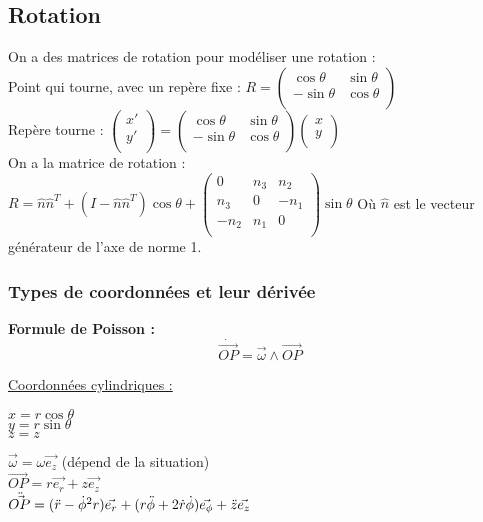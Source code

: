 \documentclass[../main.tex]{subfiles}
\begin{document}
\subsection{Rotation}
On a des matrices de rotation pour modéliser une rotation :\\
Point qui tourne, avec un repère fixe : $R = \begin{pmatrix}
    \cos{\theta} & \sin{\theta}\\
    -\sin{\theta} & \cos{\theta}\\
\end{pmatrix}$\\
Repère tourne : 
$\begin{pmatrix}
    x'\\
    y'\\
\end{pmatrix} = \begin{pmatrix}
    \cos{\theta} & \sin{\theta}\\
    -\sin{\theta} & \cos{\theta}\\
\end{pmatrix} \begin{pmatrix}
    x\\
    y\\
\end{pmatrix}$\\
On a la matrice de rotation : $R = \hat{n} \hat{n}^T + (I-\hat{n} \hat{n}^T)\cos{\theta} + \begin{pmatrix}
    0 & n_3 & n_2\\
    n_3 & 0 & -n_1\\
    -n_2 & n_1 & 0\\
\end{pmatrix} \sin{\theta}$ Où $\hat{n}$ est le vecteur générateur de l'axe de norme 1.\\

\subsubsection{Types de coordonnées et leur dérivée}
\textbf{Formule de Poisson :}\\
\begin{equation}
    \dot{\vec{OP}} = \vec{\omega} \wedge \vec{OP}
\end{equation}

\quad \underline{Coordonnées cylindriques :}\\
\begin{minipage}{.5\textwidth}
    $x = r \cos{\theta}$\\
    $y = r \sin{\theta}$\\
    $z = z$\\
\end{minipage}
\vline
\begin{minipage}{.5\textwidth}
    $\vec{\omega} = \omega \vec{e_z}$ (dépend de la situation)\\
    $\vec{OP} = r \vec{e_r} + z \vec{e_z}$\\
    $\Ddot{\vec{OP}} = (\Ddot{r} - \dot{\phi}^2 r)\vec{e_r} + (r \Ddot{\phi} + 2 \dot{r} \dot{\phi})\vec{e_{\phi}} + \Ddot{z} \vec{e_z}$\\
\end{minipage}
\end{document}
